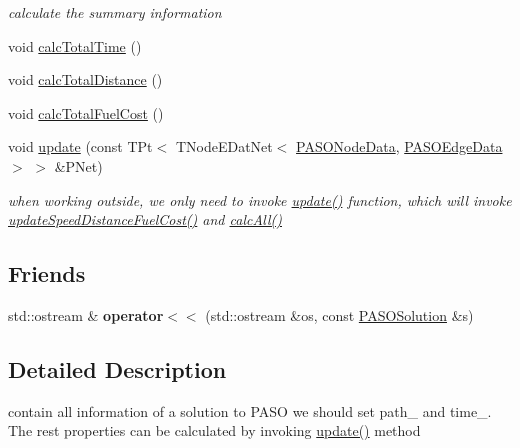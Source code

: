 \begin{DoxyCompactItemize}
\begin{DoxyCompactList}\small\item\em calculate the summary information \end{DoxyCompactList}\item 
void \hyperlink{class_p_a_s_o_solution_a6b8efdce37ee1dac32f2d441c0d25118}{calc\+Total\+Time} ()
\item 
void \hyperlink{class_p_a_s_o_solution_a059ca16f85c13d37f9b536b54aa138e8}{calc\+Total\+Distance} ()
\item 
void \hyperlink{class_p_a_s_o_solution_af14b001c7d64c8644f5348398781d6bf}{calc\+Total\+Fuel\+Cost} ()
\item 
\hypertarget{class_p_a_s_o_solution_a943ac9026630da194cd6a281c189ae79}{}void \hyperlink{class_p_a_s_o_solution_a943ac9026630da194cd6a281c189ae79}{update} (const T\+Pt$<$ T\+Node\+E\+Dat\+Net$<$ \hyperlink{class_p_a_s_o_node_data}{P\+A\+S\+O\+Node\+Data}, \hyperlink{class_p_a_s_o_edge_data}{P\+A\+S\+O\+Edge\+Data} $>$ $>$ \&P\+Net)\label{class_p_a_s_o_solution_a943ac9026630da194cd6a281c189ae79}

\begin{DoxyCompactList}\small\item\em when working outside, we only need to invoke \hyperlink{class_p_a_s_o_solution_a943ac9026630da194cd6a281c189ae79}{update()} function, which will invoke \hyperlink{class_p_a_s_o_solution_abc75d29163747bc4fc6dcdb8cc2bf894}{update\+Speed\+Distance\+Fuel\+Cost()} and \hyperlink{class_p_a_s_o_solution_abbef9e82bbaafe2f4a872942fa56e35b}{calc\+All()} \end{DoxyCompactList}\end{DoxyCompactItemize}
\subsection*{Friends}
\begin{DoxyCompactItemize}
\item 
\hypertarget{class_p_a_s_o_solution_a5cb807f0231ce6769477e549e74ef464}{}std\+::ostream \& {\bfseries operator$<$$<$} (std\+::ostream \&os, const \hyperlink{class_p_a_s_o_solution}{P\+A\+S\+O\+Solution} \&s)\label{class_p_a_s_o_solution_a5cb807f0231ce6769477e549e74ef464}

\end{DoxyCompactItemize}


\subsection{Detailed Description}
contain all information of a solution to P\+A\+S\+O  we should set path\+\_\+ and time\+\_\+. The rest properties can be calculated by invoking \hyperlink{class_p_a_s_o_solution_a943ac9026630da194cd6a281c189ae79}{update()} method 

